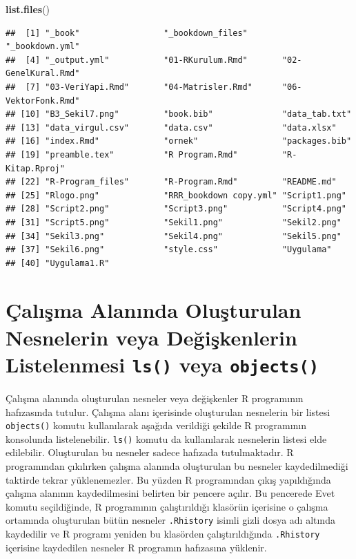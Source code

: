 \documentclass[
]{book}
\newenvironment{Shaded}{\begin{snugshade}}{\end{snugshade}}
\newcommand{\FunctionTok}[1]{\textcolor[rgb]{0.13,0.29,0.53}{\textbf{#1}}}
\newcommand{\NormalTok}[1]{#1}
\begin{document}
\begin{Shaded}
\begin{Highlighting}[]
\FunctionTok{list.files}\NormalTok{()}
\end{Highlighting}
\end{Shaded}

\begin{verbatim}
##  [1] "_book"                 "_bookdown_files"       "_bookdown.yml"        
##  [4] "_output.yml"           "01-RKurulum.Rmd"       "02-GenelKural.Rmd"    
##  [7] "03-VeriYapi.Rmd"       "04-Matrisler.Rmd"      "06-VektorFonk.Rmd"    
## [10] "B3_Sekil7.png"         "book.bib"              "data_tab.txt"         
## [13] "data_virgul.csv"       "data.csv"              "data.xlsx"            
## [16] "index.Rmd"             "ornek"                 "packages.bib"         
## [19] "preamble.tex"          "R Program.Rmd"         "R-Kitap.Rproj"        
## [22] "R-Program_files"       "R-Program.Rmd"         "README.md"            
## [25] "Rlogo.png"             "RRR_bookdown copy.yml" "Script1.png"          
## [28] "Script2.png"           "Script3.png"           "Script4.png"          
## [31] "Script5.png"           "Sekil1.png"            "Sekil2.png"           
## [34] "Sekil3.png"            "Sekil4.png"            "Sekil5.png"           
## [37] "Sekil6.png"            "style.css"             "Uygulama"             
## [40] "Uygulama1.R"
\end{verbatim}

\section{\texorpdfstring{Çalışma Alanında Oluşturulan Nesnelerin veya Değişkenlerin Listelenmesi \texttt{ls()} veya \texttt{objects()}}{Çalışma Alanında Oluşturulan Nesnelerin veya Değişkenlerin Listelenmesi ls() veya objects()}}\label{uxe7alux131ux15fma-alanux131nda-oluux15fturulan-nesnelerin-veya-deux11fiux15fkenlerin-listelenmesi-ls-veya-objects}

Çalışma alanında oluşturulan nesneler veya değişkenler R programının hafızasında tutulur. Çalışma alanı içerisinde oluşturulan nesnelerin bir listesi \texttt{objects()} komutu kullanılarak aşağıda verildiği şekilde R programının konsolunda listelenebilir. \texttt{ls()} komutu da kullanılarak nesnelerin listesi elde edilebilir. Oluşturulan bu nesneler sadece hafızada tutulmaktadır. R programından çıkılırken çalışma alanında oluşturulan bu nesneler kaydedilmediği taktirde tekrar yüklenemezler. Bu yüzden R programından çıkış yapıldığında çalışma alanının kaydedilmesini belirten bir pencere açılır. Bu pencerede Evet komutu seçildiğinde, R programının çalıştırıldığı klasörün içerisine o çalışma ortamında oluşturulan bütün nesneler \texttt{.Rhistory} isimli gizli dosya adı altında kaydedilir ve R programı yeniden bu klasörden çalıştırıldığında \texttt{.Rhistory} içerisine kaydedilen nesneler R programın hafızasına yüklenir.
\end{document}
